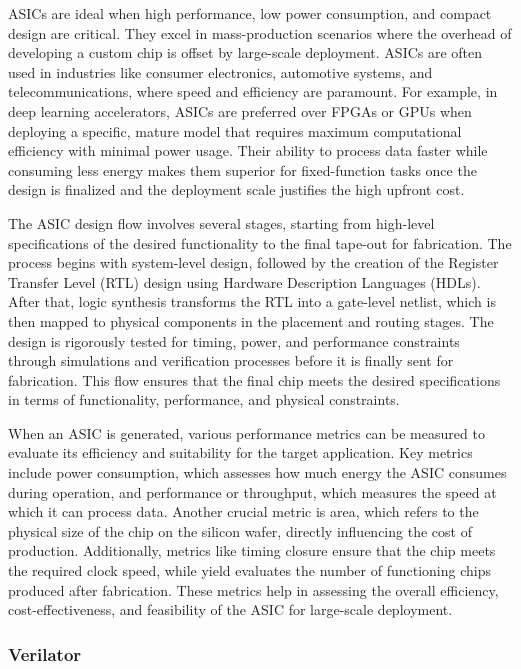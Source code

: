 ASICs are ideal when high performance, low power consumption, and compact design are critical. They excel in mass-production scenarios where the overhead of developing a custom chip is offset by large-scale deployment. ASICs are often used in industries like consumer electronics, automotive systems, and telecommunications, where speed and efficiency are paramount. For example, in deep learning accelerators, ASICs are preferred over FPGAs or GPUs when deploying a specific, mature model that requires maximum computational efficiency with minimal power usage. Their ability to process data faster while consuming less energy makes them superior for fixed-function tasks once the design is finalized and the deployment scale justifies the high upfront cost.

The ASIC design flow involves several stages, starting from high-level specifications of the desired functionality to the final tape-out for fabrication. The process begins with system-level design, followed by the creation of the Register Transfer Level (RTL) design using Hardware Description Languages (HDLs). After that, logic synthesis transforms the RTL into a gate-level netlist, which is then mapped to physical components in the placement and routing stages. The design is rigorously tested for timing, power, and performance constraints through simulations and verification processes before it is finally sent for fabrication. This flow ensures that the final chip meets the desired specifications in terms of functionality, performance, and physical constraints.

When an ASIC is generated, various performance metrics can be measured to evaluate its efficiency and suitability for the target application. Key metrics include power consumption, which assesses how much energy the ASIC consumes during operation, and performance or throughput, which measures the speed at which it can process data. Another crucial metric is area, which refers to the physical size of the chip on the silicon wafer, directly influencing the cost of production. Additionally, metrics like timing closure ensure that the chip meets the required clock speed, while yield evaluates the number of functioning chips produced after fabrication. These metrics help in assessing the overall efficiency, cost-effectiveness, and feasibility of the ASIC for large-scale deployment.

\subsubsection{Verilator}

